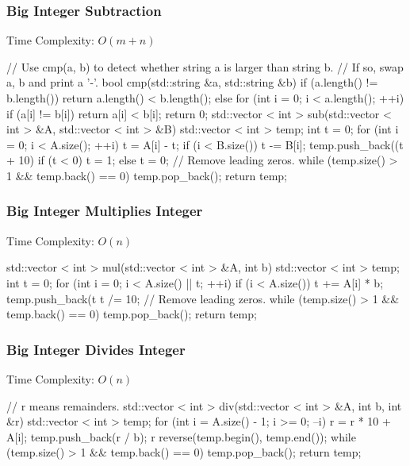\subsubsection{Big Integer Subtraction}
Time Complexity: $O(m + n)$
\begin{cppcode}
// Use cmp(a, b) to detect whether string a is larger than string b.
// If so, swap a, b and print a '-'.
bool cmp(std::string &a, std::string &b)
{
    if (a.length() != b.length()) return a.length() < b.length();
    else
        for (int i = 0; i < a.length(); ++i)
            if (a[i] != b[i]) return a[i] < b[i];
    return 0;
}
std::vector < int > sub(std::vector < int > &A, std::vector < int > &B)
{
    std::vector < int > temp; int t = 0;
    for (int i = 0; i < A.size(); ++i)
    {
        t = A[i] - t;
        if (i < B.size()) t -= B[i];
        temp.push_back((t + 10) %
        if (t < 0) t = 1; else t = 0;
    }
    // Remove leading zeros.
    while (temp.size() > 1 && temp.back() == 0) temp.pop_back();
    return temp;
}
\end{cppcode}
\subsubsection{Big Integer Multiplies Integer}
Time Complexity: $O(n)$
\begin{cppcode}
std::vector < int > mul(std::vector < int > &A, int b)
{
    std::vector < int > temp; int t = 0;
    for (int i = 0; i < A.size() || t; ++i)
    {
        if (i < A.size()) t += A[i] * b;
        temp.push_back(t %
        t /= 10;
    }
    // Remove leading zeros.
    while (temp.size() > 1 && temp.back() == 0) temp.pop_back();
    return temp;
}
\end{cppcode}
\subsubsection{Big Integer Divides Integer}
Time Complexity: $O(n)$
\begin{cppcode}
// r means remainders.
std::vector < int > div(std::vector < int > &A, int b, int &r)
{
    std::vector < int > temp;
    for (int i = A.size() - 1; i >= 0; --i)
    {
        r = r * 10 + A[i];
        temp.push_back(r / b);
        r %
    }
    reverse(temp.begin(), temp.end());
    while (temp.size() > 1 && temp.back() == 0) temp.pop_back();
    return temp;
}
\end{cppcode}